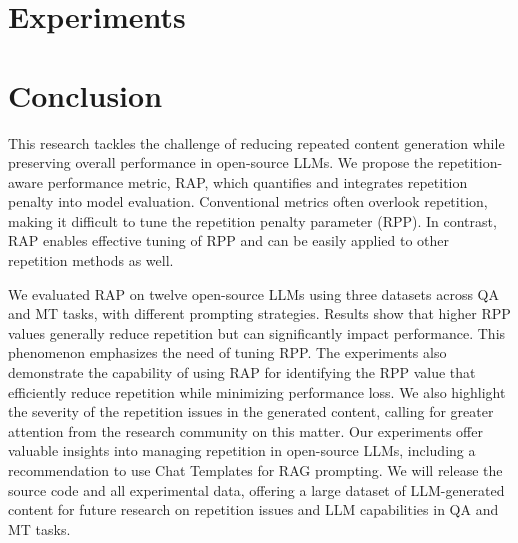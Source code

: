 \documentclass[11pt]{article}
\newcommand{\rpp}{RPP\xspace}
\newcommand{\rap}{RAP\xspace}
\begin{document}
% 

\section{Experiments}

\section{Conclusion}
This research tackles the challenge of reducing repeated content generation while preserving overall performance in open-source LLMs. We propose the repetition-aware performance metric, \rap, which quantifies and integrates repetition penalty into model evaluation. Conventional metrics often overlook repetition, making it difficult to tune the repetition penalty parameter (\rpp). In contrast, RAP enables effective tuning of \rpp and can be easily applied to other repetition methods as well.
%

We evaluated \rap on twelve open-source LLMs using three datasets across QA and MT tasks, with different prompting strategies. Results show that higher RPP values generally reduce repetition but can significantly impact performance. This phenomenon emphasizes the need of tuning \rpp. 
The experiments also demonstrate the capability of using \rap for identifying the \rpp value that efficiently reduce repetition while minimizing performance loss.
We also highlight the severity of the repetition issues in the generated content, calling for greater attention from the research community on this matter.
Our experiments offer valuable insights into managing repetition in open-source LLMs, including a recommendation to use Chat Templates for RAG prompting. We will release the source code and all experimental data, offering a large dataset of LLM-generated content for future research on repetition issues and LLM capabilities in QA and MT tasks.
\end{document}
